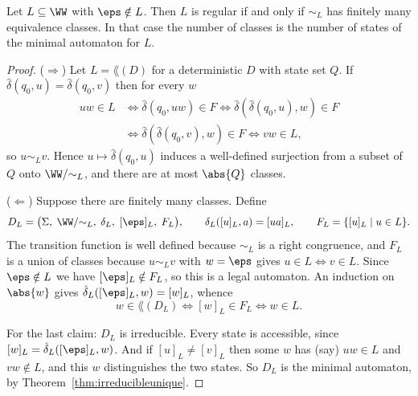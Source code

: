\begin{center}
\end{center}

\begin{theorem}\label{thm:myhillnerode}
	Let $L \subseteq \WW$ with $\eps \notin L$. Then $L$ is regular if and only if $\sim_L$ has finitely many equivalence classes. In that case the number of classes is the number of states of the minimal automaton for $L$.
\end{theorem}

\begin{proof}
	($\Rightarrow$) Let $L = \lang(D)$ for a deterministic $D$ with state set $Q$. If $\hat\delta(q_0,u) = \hat\delta(q_0,v)$ then for every $w$
	\begin{align*}
		uw \in L &\iff \hat\delta(q_0,uw) \in F \iff \hat\delta(\hat\delta(q_0,u),w) \in F \\
		&\iff \hat\delta(\hat\delta(q_0,v),w) \in F \iff vw \in L,
	\end{align*}
	so $u \sim_L v$. Hence $u \mapsto \hat\delta(q_0,u)$ induces a well-defined surjection from a subset of $Q$ onto $\WW/{\sim_L}$, and there are at most $\abs{Q}$ classes.

	($\Leftarrow$) Suppose there are finitely many classes. Define
	$$D_L = \big(\Sigma,\; \WW/{\sim_L},\; \delta_L,\; [\eps]_L,\; F_L\big), \qquad \delta_L([u]_L, a) = [ua]_L, \qquad F_L = \{[u]_L \mid u \in L\}.$$
	The transition function is well defined because $\sim_L$ is a right congruence, and $F_L$ is a union of classes because $u \sim_L v$ with $w = \eps$ gives $u \in L \iff v \in L$. Since $\eps \notin L$ we have $[\eps]_L \notin F_L$, so this is a legal automaton. An induction on $\abs{w}$ gives $\hat\delta_L([\eps]_L, w) = [w]_L$, whence
	$$w \in \lang(D_L) \iff [w]_L \in F_L \iff w \in L.$$

	For the last claim: $D_L$ is irreducible. Every state is accessible, since $[w]_L = \hat\delta_L([\eps]_L,w)$. And if $[u]_L \neq [v]_L$ then some $w$ has (say) $uw \in L$ and $vw \notin L$, and this $w$ distinguishes the two states. So $D_L$ is the minimal automaton, by Theorem~\ref{thm:irreducibleunique}.
\end{proof}

